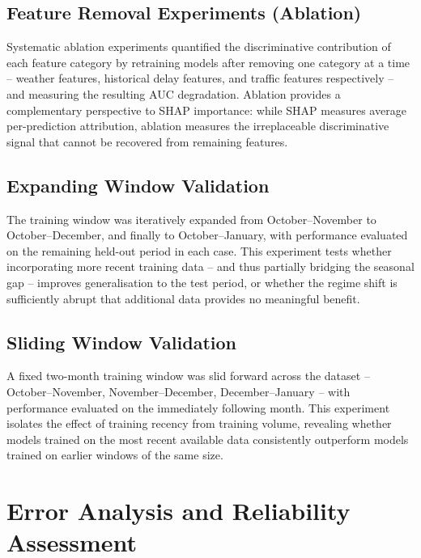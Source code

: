\documentclass{report}
\begin{document}
\subsection{Feature Removal Experiments (Ablation)}

Systematic ablation experiments quantified the discriminative contribution of
each feature category by retraining models after removing one category at a
time -- weather features, historical delay features, and traffic features
respectively -- and measuring the resulting AUC degradation.  Ablation
provides a complementary perspective to SHAP importance: while SHAP measures
average per-prediction attribution, ablation measures the irreplaceable
discriminative signal that cannot be recovered from remaining features.

\subsection{Expanding Window Validation}

The training window was iteratively expanded from October--November to
October--December, and finally to October--January, with performance
evaluated on the remaining held-out period in each case.  This experiment
tests whether incorporating more recent training data -- and thus partially
bridging the seasonal gap -- improves generalisation to the test period, or
whether the regime shift is sufficiently abrupt that additional data provides
no meaningful benefit.

\subsection{Sliding Window Validation}

A fixed two-month training window was slid forward across the dataset --
October--November, November--December, December--January -- with performance
evaluated on the immediately following month.  This experiment isolates the
effect of training recency from training volume, revealing whether models
trained on the most recent available data consistently outperform models
trained on earlier windows of the same size.


\section{Error Analysis and Reliability Assessment}
\label{sec:error_method}
\end{document}
